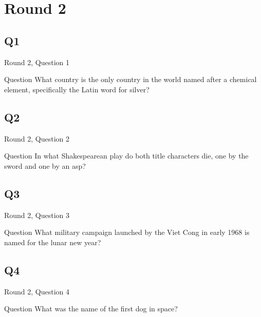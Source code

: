 \documentclass[11pt]{beamer}
\begin{document}
\section{Round 2}
    

\subsection*{Q1}
\begin{frame}[t]{Round 2, Question 1}
\vspace{2em}
\begin{block}{Question}
What country is the only country in the world named after a chemical element, specifically the Latin word for silver\@?
\end{block}
\end{frame}
    

\subsection*{Q2}
\begin{frame}[t]{Round 2, Question 2}
\vspace{2em}
\begin{block}{Question}
In what Shakespearean play do both title characters die, one by the sword and one by an asp\@?
\end{block}
\end{frame}
    

\subsection*{Q3}
\begin{frame}[t]{Round 2, Question 3}
\vspace{2em}
\begin{block}{Question}
What military campaign launched by the Viet Cong in early 1968 is named for the lunar new year\@?
\end{block}
\end{frame}
    

\subsection*{Q4}
\begin{frame}[t]{Round 2, Question 4}
\vspace{2em}
\begin{block}{Question}
What was the name of the first dog in space\@?
\end{block}
\end{frame}
    
\end{document}
